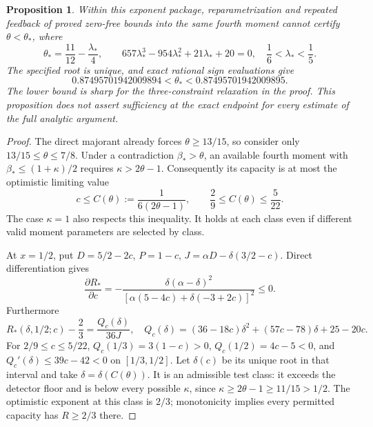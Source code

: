 \documentclass[11pt]{article}
\newtheorem{proposition}{Proposition}
\newcommand{\Bstar}{\beta_*}
\begin{document}
\begin{proposition}\label{prop:feedback-barrier}
Within this exponent package, reparametrization and repeated feedback of
proved zero-free bounds into the same fourth moment cannot certify
$\theta<\theta_*$, where
\[
 \theta_* =\frac{11}{12}-\frac{\lambda_*}{4},\qquad
 657\lambda_*^3-954\lambda_*^2+21\lambda_*+20=0,
 \quad \frac16<\lambda_*<\frac15.
\]
The specified root is unique, and exact rational sign evaluations give
\[
 0.87495701942009894<\theta_*<0.87495701942009895.
\]
The lower bound is sharp for the three-constraint relaxation in the
proof. This proposition does not assert sufficiency at the exact endpoint
for every estimate of the full analytic argument.
\end{proposition}
\begin{proof}
The direct majorant already forces $\theta\ge13/15$, so consider only
$13/15\le\theta\le7/8$. Under a contradiction $\Bstar>\theta$, an
available fourth moment with $\Bstar\le(1+\kappa)/2$ requires
$\kappa>2\theta-1$. Consequently its capacity is at most the optimistic
limiting value
\[
 c\le C(\theta):=\frac1{6(2\theta-1)},\qquad
 \frac29\le C(\theta)\le\frac5{22}.
\]
The case $\kappa=1$ also respects this inequality. It holds at each
class even if different valid moment parameters are selected by class.

At $x=1/2$, put
$D=5/2-2c$, $P=1-c$, $J=\alpha D-\delta(3/2-c)$.
Direct differentiation gives
\[
 \frac{\partial R_*}{\partial c}
 =-\frac{\delta(\alpha-\delta)^2}
 {[\alpha(5-4c)+\delta(-3+2c)]^2}\le0.
\]
Furthermore
\[
 R_*(\delta,1/2;c)-\frac23=\frac{Q_c(\delta)}{36J},\quad
 Q_c(\delta)=(36-18c)\delta^2+(57c-78)\delta+25-20c.
\]
For $2/9\le c\le5/22$,
$Q_c(1/3)=3(1-c)>0$, $Q_c(1/2)=4c-5<0$, and
$Q_c'(\delta)\le39c-42<0$ on $[1/3,1/2]$.
Let $\delta(c)$ be its unique root in that interval and take
$\delta=\delta(C(\theta))$. It is an admissible test class: it exceeds
the detector floor and is below every possible $\kappa$, since
$\kappa\ge2\theta-1\ge11/15>1/2$. The optimistic exponent at this
class is $2/3$; monotonicity implies every permitted capacity has
$R\ge2/3$ there.


\end{proof}
\end{document}
